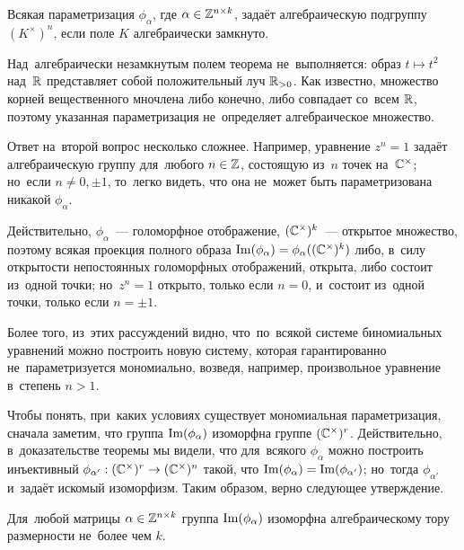\begin{theorem}
\label{theorem:AlgebraicityCondition}
  Всякая параметризация $\phi_\alpha$, где $\alpha \in \mathbb{Z}^{n \times k}$, задаёт алгебраическую подгруппу $(K^\times)^n$,
  если поле $K$ алгебраически замкнуто.
\end{theorem}

\begin{example*}
  Над~алгебраически незамкнутым полем теорема не~выполняется: образ $t \mapsto t^2$ над~$\mathbb{R}$
  представляет собой положительный луч $\mathbb{R}_{>0}$. Как известно, множество корней вещественного мночлена либо конечно,
  либо совпадает со~всем $\mathbb{R}$, поэтому указанная параметризация не~определяет алгебраическое множество.
\end{example*}

Ответ на~второй вопрос несколько сложнее. Например, уравнение $z^n = 1$ задаёт алгебраическую
группу для~любого $n \in \mathbb{Z}$, состоящую из~$n$ точек на~$\mathbb{C}^\times$; но~если $n \neq 0, \pm 1$,
то~легко видеть, что она не~может быть параметризована никакой $\phi_\alpha$.

Действительно, $\phi_\alpha$~— голоморфное отображение, $(\mathbb{C}^\times)^k$~— открытое множество,
поэтому всякая проекция полного образа $\mathrm{Im}(\phi_\alpha) = \phi_\alpha((\mathbb{C}^\times)^k)$ либо, в~силу
открытости непостоянных голоморфных отображений, открыта, либо состоит из~одной точки; но~$z^n = 1$
открыто, только если $n = 0$, и~состоит из~одной точки, только если $n = \pm 1$.

Более того, из~этих рассуждений видно, что~по~всякой системе биномиальных уравнений можно построить новую систему,
которая гарантированно не~параметризуется мономиально, возведя, например, произвольное уравнение в~степень $n > 1$.

Чтобы понять, при~каких условиях существует мономиальная параметризация, сначала заметим, что группа $\mathrm{Im}(\phi_\alpha)$
изоморфна группе $(\mathbb{C}^\times)^r$. Действительно, в~доказательстве теоремы мы видели, что для~всякого $\phi_\alpha$
можно построить инъективный $\phi_{\alpha'} : (\mathbb{C}^\times)^r \rightarrow (\mathbb{C}^\times)^n$ такой, что $\mathrm{Im}(\phi_\alpha) = \mathrm{Im}(\phi_{\alpha'})$;
но~тогда $\phi_{\alpha'}$ и~задаёт искомый изоморфизм. Таким образом, верно следующее утверждение.

\begin{statement*}
  Для~любой матрицы $\alpha \in \mathbb{Z}^{n \times k}$ группа $\mathrm{Im}(\phi_\alpha)$ изоморфна алгебраическому тору размерности не~более чем $k$.
\end{statement*}

